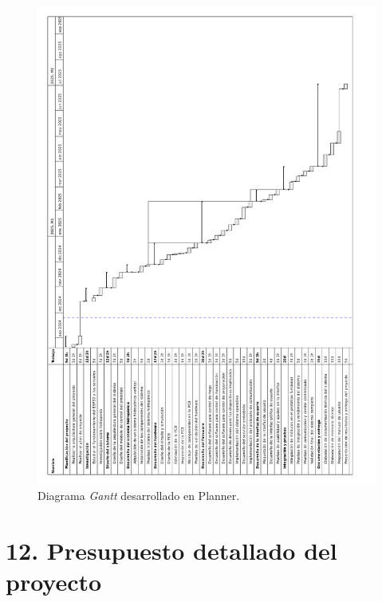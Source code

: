 \documentclass[
11pt, %
]{charter}
\begin{document}
\begin{landscape}

\begin{figure}[htpb]
\centering
\includegraphics[angle=270, width=1.5\textheight]{./Figuras/salida.pdf}
\caption{Diagrama \textit{Gantt} desarrollado en Planner.} %
\label{fig:diagGantt}
\end{figure}


\end{landscape}



\section{12. Presupuesto detallado del proyecto}
\label{sec:presupuesto}
\end{document}

